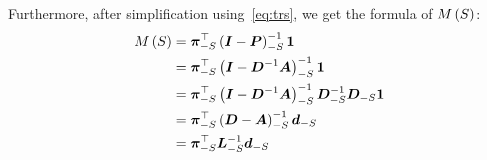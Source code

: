 \documentclass[sigconf]{acmart}
\begin{document}
Furthermore, after simplification using~\eqref{eq:trs}, we get the formula of \(M\left(S\right)\):
\begin{equation}\label{eq:MANC}
    \begin{split}
        M\left(S\right) & =\boldsymbol{\pi}_{-S}^\top\left( \boldsymbol{I}-\boldsymbol{P} \right)_{-S}^{-1}\boldsymbol{1}                                    \\
        & =\boldsymbol{\pi}_{-S}^\top\left( \boldsymbol{I}-\boldsymbol{D}^{-1}\boldsymbol{A} \right)_{-S}^{-1}\boldsymbol{1}                          \\
        & =\boldsymbol{\pi}_{-S}^\top\left( \boldsymbol{I}-\boldsymbol{D}^{-1}\boldsymbol{A} \right)_{-S}^{-1}\boldsymbol{D}_{-S}^{-1}\boldsymbol{D}_{-S}\boldsymbol{1} \\
        & =\boldsymbol{\pi}_{-S}^\top\left( \boldsymbol{D}-\boldsymbol{A} \right)_{-S}^{-1}\boldsymbol{d}_{-S}                                \\
        & =\boldsymbol{\pi}_{-S}^\top\boldsymbol{L}_{-S}^{-1}\boldsymbol{d}_{-S}
    \end{split}
\end{equation}



\end{document}

